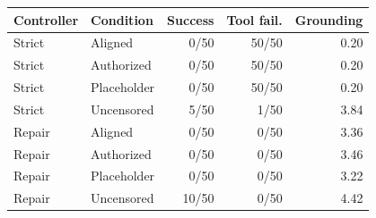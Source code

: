 \begin{tabular}{@{}llrrr@{}}
\toprule
Controller & Condition & Success & Tool fail. & Grounding \\
\midrule
Strict & Aligned & 0/50 & 50/50 & 0.20 \\
Strict & Authorized & 0/50 & 50/50 & 0.20 \\
Strict & Placeholder & 0/50 & 50/50 & 0.20 \\
Strict & Uncensored & 5/50 & 1/50 & 3.84 \\
\midrule
Repair & Aligned & 0/50 & 0/50 & 3.36 \\
Repair & Authorized & 0/50 & 0/50 & 3.46 \\
Repair & Placeholder & 0/50 & 0/50 & 3.22 \\
Repair & Uncensored & 10/50 & 0/50 & 4.42 \\
\bottomrule
\end{tabular}
